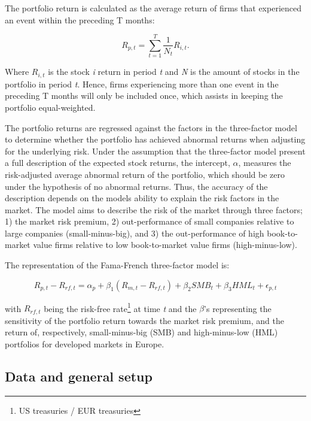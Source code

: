 The portfolio return is calculated as the average return of firms that experienced an event within the preceding T months:

\begin{equation}
    R_{p,t} = \sum_{t = 1} ^{T} \frac{1}{N_t} R_{i,t}.
\end{equation}

Where $R_{i,t}$ is the stock \textit{i} return in period \textit{t} and \textit{N} is the amount of stocks in the portfolio in period \textit{t}. Hence, firms experiencing more than one event in the preceding T months will only be included once, which assists in keeping the portfolio equal-weighted. 

The portfolio returns are regressed against the factors in the \cite{Fama_french_3fac} three-factor model to determine whether the portfolio has achieved abnormal returns when adjusting for the underlying risk. Under the assumption that the three-factor model present a full description of the expected stock returns, the intercept, $\alpha$, measures the risk-adjusted average abnormal return of the portfolio, which should be zero under the hypothesis of no abnormal returns. Thus, the accuracy of the description depends on the models ability to explain the risk factors in the market. The model aims to describe the risk of the market through three factors; 1) the market risk premium, 2) out-performance of small companies relative to large companies (small-minus-big), and 3) the out-performance of high book-to-market value firms  relative to low book-to-market value firms (high-minus-low). 

The representation of the Fama-French three-factor model is:

\begin{equation} \label{eq: FF5}
    R_{p,t} - R_{rf,t} = \alpha_p + \beta_1(R_{m,t} - R_{rf,t}) + \beta_2 SMB_t + \beta_3 HML_t + \epsilon_{p,t} 
\end{equation}

with $R_{rf,t}$ being the risk-free rate\footnote{US treasuries / EUR treasuries} at time \textit{t} and the $\beta$'s representing the sensitivity of the portfolio return towards the market risk premium, and the return of, respectively, small-minus-big (SMB) and high-minus-low (HML) portfolios for developed markets in Europe.   



\subsection{Data and general setup}

